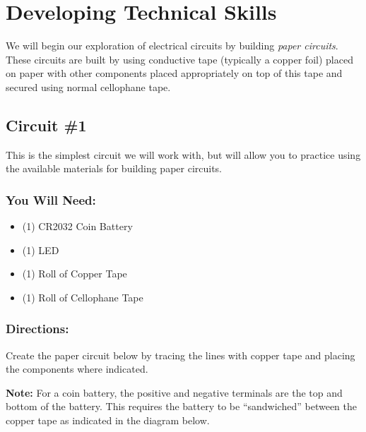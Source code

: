     \pagebreak

    \section{Developing Technical Skills}
    We will begin our exploration of electrical circuits by building \emph{paper circuits}. These circuits are built by using conductive tape (typically a copper foil) placed on paper with other components placed appropriately on top of this tape and secured using normal cellophane tape.

    \subsection{Circuit \#1}
    This is the simplest circuit we will work with, but will allow you to practice using the available materials for building paper circuits.

    \subsubsection*{You Will Need:}
    \begin{itemize}[noitemsep]\small
        \item (1) CR2032 Coin Battery
        \item (1) LED
        \item (1) Roll of Copper Tape
        \item (1) Roll of Cellophane Tape
    \end{itemize}

    \subsubsection*{Directions:}
    Create the paper circuit below by tracing the lines with copper tape and placing the components where indicated.

    \medskip
    \textbf{Note:} For a coin battery, the positive and negative terminals are the top and bottom of the battery. This requires the battery to be ``sandwiched'' between the copper tape as indicated in the diagram below.

